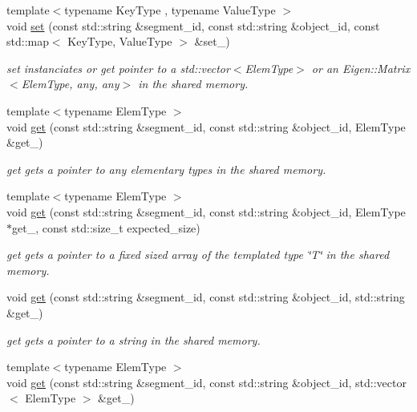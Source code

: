\begin{DoxyCompactItemize}
{\footnotesize template$<$typename Key\+Type , typename Value\+Type $>$ }\\void \hyperlink{namespaceshared__memory_a562e79433e54463f39c9c276b8440f4b}{set} (const std\+::string \&segment\+\_\+id, const std\+::string \&object\+\_\+id, const std\+::map$<$ Key\+Type, Value\+Type $>$ \&set\+\_\+)
\begin{DoxyCompactList}\small\item\em set instanciates or get pointer to a std\+::vector$<$\+Elem\+Type$>$ or an Eigen\+::\+Matrix$<$\+Elem\+Type, any, any$>$ in the shared memory. \end{DoxyCompactList}\item 
{\footnotesize template$<$typename Elem\+Type $>$ }\\void \hyperlink{namespaceshared__memory_ad017562102dbe044db2de6c79c0669d3}{get} (const std\+::string \&segment\+\_\+id, const std\+::string \&object\+\_\+id, Elem\+Type \&get\+\_\+)
\begin{DoxyCompactList}\small\item\em get gets a pointer to any elementary types in the shared memory. \end{DoxyCompactList}\item 
{\footnotesize template$<$typename Elem\+Type $>$ }\\void \hyperlink{namespaceshared__memory_a6241b9143a2152b0c0beb784869373c7}{get} (const std\+::string \&segment\+\_\+id, const std\+::string \&object\+\_\+id, Elem\+Type $\ast$get\+\_\+, const std\+::size\+\_\+t expected\+\_\+size)
\begin{DoxyCompactList}\small\item\em get gets a pointer to a fixed sized array of the templated type \char`\"{}\+T\char`\"{} in the shared memory. \end{DoxyCompactList}\item 
void \hyperlink{namespaceshared__memory_a8a952cc446e3dce8fea8cd1ea02613f9}{get} (const std\+::string \&segment\+\_\+id, const std\+::string \&object\+\_\+id, std\+::string \&get\+\_\+)
\begin{DoxyCompactList}\small\item\em get gets a pointer to a string in the shared memory. \end{DoxyCompactList}\item 
{\footnotesize template$<$typename Elem\+Type $>$ }\\void \hyperlink{namespaceshared__memory_afd0ab66344562f5d927dea0d319a6a08}{get} (const std\+::string \&segment\+\_\+id, const std\+::string \&object\+\_\+id, std\+::vector$<$ Elem\+Type $>$ \&get\+\_\+)

\end{DoxyCompactItemize}
